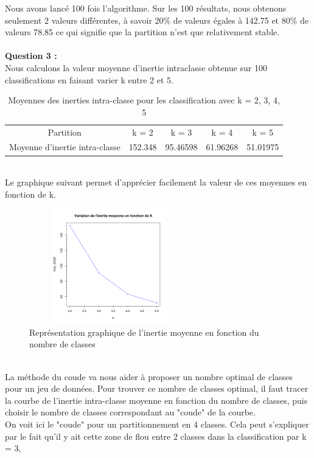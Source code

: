 \documentclass[a4paper, 10pt]{article}
\begin{document}
Nous avons lancé 100 fois l’algorithme.
Sur les 100 résultats, nous obtenons seulement 2 valeurs différentes,
à savoir 20\% de valeurs égales à 142.75 et 80\% de valeurs 78.85 ce qui signifie que la partition n'est que relativement stable.\\ \\
\textbf{Question 3 :}\\
Nous calculons la valeur moyenne d’inertie intraclasse obtenue sur 100 classifications en faisant varier
k entre 2 et 5.
\begin{table}[h]
  \centering
	\begin{tabular}{ccccc}
		Partition &  k = 2 &  k = 3 &  k = 4  &  k = 5 \\
		Moyenne d'inertie intra-classe & 152.348 & 95.46598 & 61.96268 &51.01975\\
	\end{tabular}
  \caption{Moyennes des inerties intra-classe pour les classification avec k = 2, 3, 4, 5}
\end{table}\\
Le graphique suivant permet d’apprécier facilement la valeur de ces moyennes en fonction de k.\\
\begin{figure}[h!]
  \centering
	\includegraphics[height = 5cm, width = 7cm]{plots/plot_moy_inerties_k.png}
  \caption{Représentation graphique de l'inertie moyenne en fonction du nombre de classes}
\end{figure}\\
La méthode du coude va nous aider à proposer un nombre optimal de classes pour un jeu de données.
Pour trouver ce nombre de classes optimal, il faut tracer la courbe de l'inertie intra-classe moyenne en fonction du nombre de classes,
puis choisir le nombre de classes correspondant au "coude" de la courbe.\\
On voit ici le "coude" pour un partitionnement en 4 classes.
Cela peut s'expliquer par le fait qu'il y ait cette zone de flou entre 2 classes dans la classification par k = 3,
\end{document}
